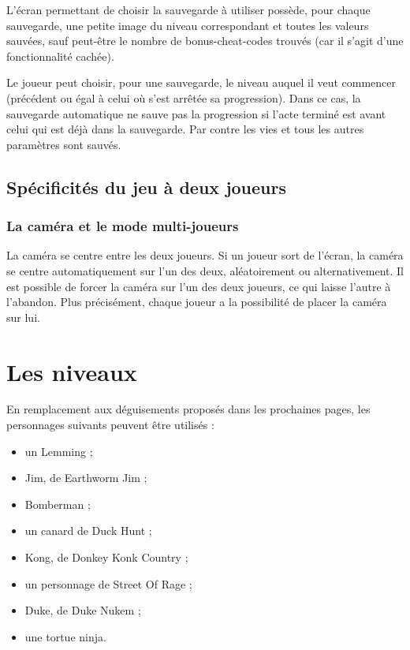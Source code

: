 \documentclass{article}
\begin{document}
L'écran permettant de choisir la sauvegarde à utiliser possède, pour
chaque sauvegarde, une petite image du niveau correspondant et toutes
les valeurs sauvées, sauf peut-être le nombre de bonus-cheat-codes
trouvés (car il s'agit d'une fonctionnalité cachée).

Le joueur peut choisir, pour une sauvegarde, le niveau auquel il veut
commencer (précédent ou égal à celui où s'est arrêtée sa
progression). Dans ce cas, la sauvegarde automatique ne sauve pas la
progression si l'acte terminé est avant celui qui est déjà dans la
sauvegarde. Par contre les vies et tous les autres paramètres sont
sauvés.

\subsection{Spécificités du jeu à deux joueurs}
\subsubsection{La caméra et le mode multi-joueurs}
La caméra se centre entre les deux joueurs. Si un joueur sort de
l'écran, la caméra se centre automatiquement sur l'un des deux,
aléatoirement ou alternativement. Il est possible de forcer la caméra
sur l'un des deux joueurs, ce qui laisse l'autre à l'abandon. Plus
précisément, chaque joueur a la possibilité de placer la caméra sur
lui.

\section{Les niveaux}

En remplacement aux déguisements proposés dans
les prochaines pages, les personnages suivants peuvent être utilisés :
\begin{itemize}
\item un Lemming ;
\item Jim, de Earthworm Jim ;
\item Bomberman ;
\item un canard de Duck Hunt ;
\item Kong, de Donkey Konk Country ;
\item un personnage de Street Of Rage ;
\item Duke, de Duke Nukem ;
\item une tortue ninja.
\end{itemize}
\end{document}
